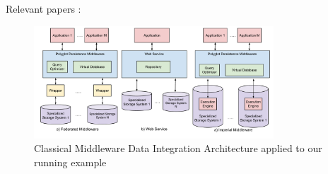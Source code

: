 Relevant papers : ~\cite{Lenzerini2002} ~\cite{Kirk1995} ~\cite{Katsis2009}
~\cite{Srivastava2006} ~\cite{Tatbul2010} ~\cite{Botan2009} ~\cite{Botan2010} ~\cite{Lim2013}
~\cite{Sharp2013} ~\cite{Cure2011} ~\cite{Atzeni2012} ~\cite{Sellami2014} ~\cite{Sellami2013}
~\cite{Ong2014} ~\cite{Ong2015} ~\cite{Boag2010} ~\cite{Ives2002} ~\cite{Borkar2006}
~\cite{Liu2010} ~\cite{Fowler2012}

 
 
\begin{figure}
 \centering
  \includegraphics[width=0.8\textwidth]{images/MiddlewareArchitecture.pdf}
  \caption{Classical Middleware Data Integration Architecture applied to our running example}
  \label{fig:dblandscape}
\end{figure}



